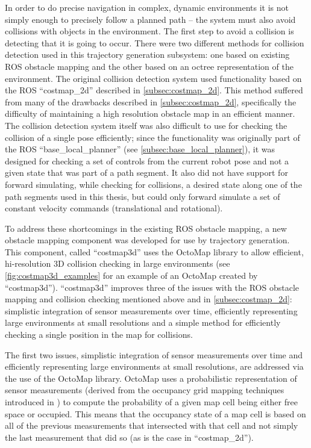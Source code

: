 In order to do precise navigation in complex, dynamic environments it is not simply enough to precisely follow a planned path -- the system must also avoid collisions with objects in the environment. The first step to avoid a collision is detecting that it is going to occur. There were two different methods for collision detection used in this trajectory generation subsystem: one based on existing ROS obstacle mapping and the other based on an octree representation of the environment. The original collision detection system used functionality based on the ROS ``costmap\_2d'' described in \autoref{subsec:costmap_2d}. This method suffered from many of the drawbacks described in \autoref{subsec:costmap_2d}, specifically the difficulty of maintaining a high resolution obstacle map in an efficient manner. The collision detection system itself was also difficult to use for checking the collision of a single pose efficiently; since the functionality was originally part of the ROS ``base\_local\_planner'' (see \autoref{subsec:base_local_planner}), it was designed for checking a set of controls from the current robot pose and not a given state that was part of a path segment. It also did not have support for forward simulating, while checking for collisions, a desired state along one of the path segments used in this thesis, but could only forward simulate a set of constant velocity commands (translational and rotational).

To address these shortcomings in the existing ROS obstacle mapping, a new obstacle mapping component was developed for use by trajectory generation. This component, called ``costmap3d'' uses the OctoMap library \autocite{octomap} to allow efficient, hi-resolution 3D collision checking in large environments (see \autoref{fig:costmap3d_examples} for an example of an OctoMap created by ``costmap3d''). ``costmap3d'' improves three of the issues with the ROS obstacle mapping and collision checking mentioned above and in \autoref{subsec:costmap_2d}: simplistic integration of sensor measurements over time, efficiently representing large environments at small resolutions and a simple method for efficiently checking a single position in the map for collisions.

The first two issues, simplistic integration of sensor measurements over time and efficiently representing large environments at small resolutions, are addressed via the use of the OctoMap library. OctoMap uses a probabilistic representation of sensor measurements (derived from the occupancy grid mapping techniques introduced in \autocite{Moravec_1985_1840}) to compute the probability of a given map cell being either free space or occupied. This means that the occupancy state of a map cell is based on all of the previous measurements that intersected with that cell and not simply the last measurement that did so (as is the case in ``costmap\_2d'').

